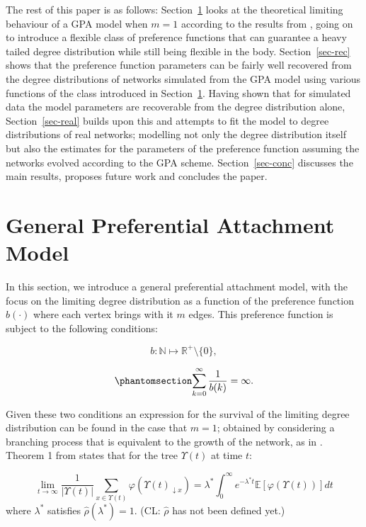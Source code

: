 \documentclass[
  sn-basic,
]{sn-jnl}
\theoremstyle{plain}
\theoremstyle{remark}
\begin{document}
The rest of this paper is as follows: Section~\ref{sec-gpa} looks at the
theoretical limiting behaviour of a GPA model when \(m=1\) according to
the results from \citet{rudas07}, going on to introduce a flexible class
of preference functions that can guarantee a heavy tailed degree
distribution while still being flexible in the body.
Section~\ref{sec-rec} shows that the preference function parameters can
be fairly well recovered from the degree distributions of networks
simulated from the GPA model using various functions of the class
introduced in Section~\ref{sec-gpa}. Having shown that for simulated
data the model parameters are recoverable from the degree distribution
alone, Section~\ref{sec-real} builds upon this and attempts to fit the
model to degree distributions of real networks; modelling not only the
degree distribution itself but also the estimates for the parameters of
the preference function assuming the networks evolved according to the
GPA scheme. Section~\ref{sec-conc} discusses the main results, proposes
future work and concludes the paper.

\section{General Preferential Attachment Model}\label{sec-gpa}

In this section, we introduce a general preferential attachment model,
with the focus on the limiting degree distribution as a function of the
preference function \(b(\cdot)\) where each vertex brings with it \(m\)
edges. This preference function is subject to the following conditions:

\[
b:\mathbb N \mapsto \mathbb R^+\setminus\{0\},
\]

\begin{equation}\phantomsection\label{eq-condb2}{
\sum_{k=0}^\infty\frac{1}{b(k)} = \infty.
}\end{equation}

Given these two conditions an expression for the survival of the
limiting degree distribution can be found in the case that \(m=1\);
obtained by considering a branching process that is equivalent to the
growth of the network, as in \citet{rudas07}. Theorem 1 from
\citet{rudas07} states that for the tree \(\Upsilon(t)\) at time \(t\):

\[
\lim_{t\rightarrow\infty}\frac{1}{|\Upsilon(t)|}\sum_{x\in\Upsilon(t)}\varphi(\Upsilon(t)_{\downarrow x}) = \lambda^* \int_0^\infty e^{-\lambda^* t}\mathbb E\left[\varphi(\Upsilon(t))\right]dt
\] where \(\lambda^*\) satisfies \(\hat\rho(\lambda^*)=1\). (CL:
\(\hat{\rho}\) has not been defined yet.)
\end{document}
